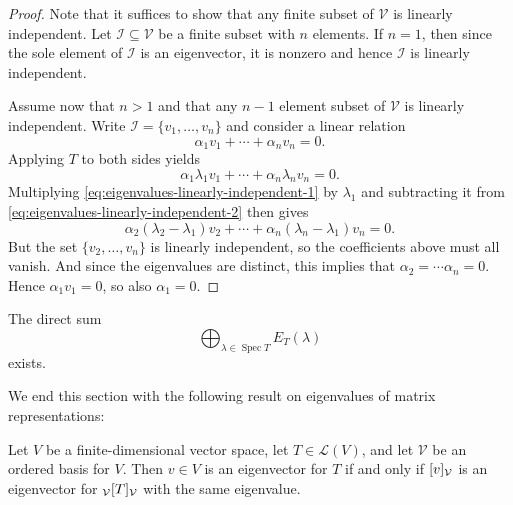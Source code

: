 \documentclass[a4paper, 11pt]{memoir}
\DeclareMathOperator{\spec}{Spec}
\theoremstyle{plaincustomnumber}
\theoremstyle{changedotbreakcustomnumber}
\newcommand{\calL}{\mathcal{L}}
\newcommand{\calV}{\mathcal{V}}
\newcommand{\calI}{\mathcal{I}}
\begin{document}
\begin{proof}
    Note that it suffices to show that any finite subset of $\calV$ is linearly independent. Let $\calI \subseteq \calV$ be a finite subset with $n$ elements. If $n = 1$, then since the sole element of $\calI$ is an eigenvector, it is nonzero and hence $\calI$ is linearly independent.

    Assume now that $n > 1$ and that any $n-1$ element subset of $\calV$ is linearly independent. Write $\calI = \{v_1, \ldots, v_n\}$ and consider a linear relation
    \begin{equation}
        \label{eq:eigenvalues-linearly-independent-1}
        \alpha_1 v_1 + \cdots + \alpha_n v_n = 0.
    \end{equation}
    Applying $T$ to both sides yields
    \begin{equation}
        \label{eq:eigenvalues-linearly-independent-2}
        \alpha_1 \lambda_1 v_1 + \cdots + \alpha_n \lambda_n v_n = 0.
    \end{equation}
    Multiplying \cref{eq:eigenvalues-linearly-independent-1} by $\lambda_1$ and subtracting it from \cref{eq:eigenvalues-linearly-independent-2} then gives
    \begin{equation*}
        \alpha_2 (\lambda_2 - \lambda_1) v_2 + \cdots + \alpha_n (\lambda_n - \lambda_1) v_n = 0.
    \end{equation*}
    But the set $\{v_2, \ldots, v_n\}$ is linearly independent, so the coefficients above must all vanish. And since the eigenvalues are distinct, this implies that $\alpha_2 = \cdots \alpha_n = 0$. Hence $\alpha_1 v_1 = 0$, so also $\alpha_1 = 0$.
\end{proof}


\begin{corollarynoproof}
    The direct sum
    \begin{equation*}
        \bigoplus_{\lambda \in \spec T} E_T(\lambda)
    \end{equation*}
    exists.
\end{corollarynoproof}


\newpar

We end this section with the following result on eigenvalues of matrix representations:

\begin{lemma}
    \label{lemma:mr-eigenvalues}
    Let $V$ be a finite-dimensional vector space, let $T \in \calL(V)$, and let $\calV$ be an ordered basis for $V$. Then $v \in V$ is an eigenvector for $T$ if and only if $\coordvec{v}{\calV}$ is an eigenvector for $\mr{\calV}{T}{\calV}$ with the same eigenvalue.
\end{lemma}
\end{document}
